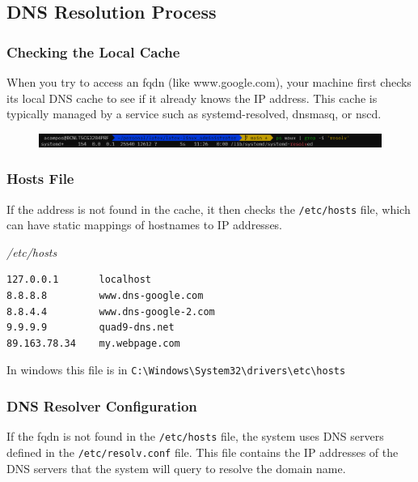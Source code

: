 \documentclass{article}
\newenvironment{blocktemplate}[1]{%
    \tcolorbox[beamer,%
    noparskip,breakable,
    colframe=Blue,%
    colbacklower=LimeGreen!75!LightGreen,%
    title=#1]}%
    {\endtcolorbox}
\newenvironment{codetemplate}[1][]{%
  \mybasecolorbox[#1]
  \itshape
}{%
  \endmybasecolorbox
}
\begin{document}
\subsection{DNS Resolution Process}

\subsubsection{Checking the Local Cache}
When you try to access an fqdn (like www.google.com), your machine first checks its local DNS cache to see if it already knows the IP address. This cache is typically managed by a service such as systemd-resolved, dnsmasq, or nscd.

\begin{figure}[H]
    \includegraphics[width=\textwidth]{pictures/resolved.png}
    \centering
\end{figure}

\subsubsection{Hosts File}
If the address is not found in the cache, it then checks the \verb|/etc/hosts| file, which can have static mappings of hostnames to IP addresses.

\begin{codetemplate}{/etc/hosts}
\begin{verbatim}
127.0.0.1       localhost
8.8.8.8         www.dns-google.com
8.8.4.4         www.dns-google-2.com
9.9.9.9         quad9-dns.net
89.163.78.34    my.webpage.com
\end{verbatim}
\end{codetemplate}

\begin{blocktemplate}{Note}
In windows this file is in \verb|C:\Windows\System32\drivers\etc\hosts|
\end{blocktemplate}

\subsubsection{DNS Resolver Configuration}
If the fqdn is not found in the \verb+/etc/hosts+ file, the system uses DNS servers defined in the \verb+/etc/resolv.conf+ file. This file contains the IP addresses of the DNS servers that the system will query to resolve the domain name.
\end{document}
